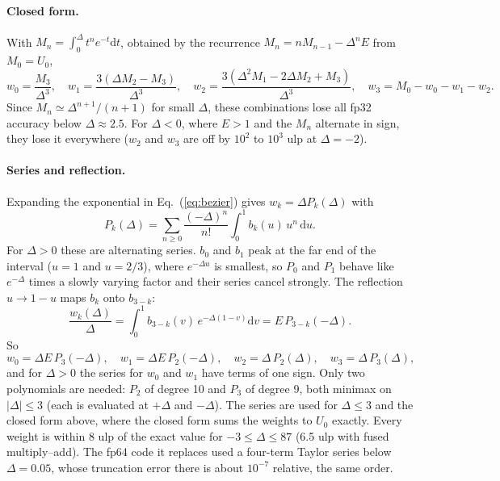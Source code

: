 \documentclass[paper=a4, fontsize=11pt]{scrartcl}
\numberwithin{equation}{section}
\numberwithin{table}{section}
\begin{document}
\paragraph{Closed form.}
With $M_n=\int_0^\Delta t^n e^{-t}\mathrm{d}t$, obtained by the recurrence
$M_n = nM_{n-1}-\Delta^nE$ from $M_0=U_0$,
\begin{equation}
  w_0 = \frac{M_3}{\Delta^3},\quad
  w_1 = \frac{3(\Delta M_2-M_3)}{\Delta^3},\quad
  w_2 = \frac{3(\Delta^2M_1-2\Delta M_2+M_3)}{\Delta^3},\quad
  w_3 = M_0-w_0-w_1-w_2 .
\end{equation}
Since $M_n\simeq\Delta^{n+1}/(n+1)$ for small $\Delta$, these combinations lose
all fp32 accuracy below $\Delta\approx2.5$. For $\Delta<0$, where $E>1$ and the
$M_n$ alternate in sign, they lose it everywhere ($w_2$ and $w_3$ are off by
$10^2$ to $10^3$ ulp at $\Delta=-2$).

\paragraph{Series and reflection.}
Expanding the exponential in Eq.~(\ref{eq:bezier}) gives $w_k=\Delta P_k(\Delta)$ with
\begin{equation}
  P_k(\Delta) = \sum_{n\ge0}\frac{(-\Delta)^n}{n!}\int_0^1 b_k(u)\,u^n\,\mathrm{d}u .
\end{equation}
For $\Delta>0$ these are alternating series. $b_0$ and $b_1$ peak at the far
end of the interval ($u=1$ and $u=2/3$), where $e^{-\Delta u}$ is smallest, so
$P_0$ and $P_1$ behave like $e^{-\Delta}$ times a slowly varying factor and their
series cancel strongly. The reflection $u\to1-u$ maps $b_k$ onto $b_{3-k}$:
\begin{equation}
  \frac{w_k(\Delta)}{\Delta} = \int_0^1 b_{3-k}(v)\,e^{-\Delta(1-v)}\mathrm{d}v
  = E\,P_{3-k}(-\Delta) .
\end{equation}
So
\begin{equation}
  w_0 = \Delta E\,P_3(-\Delta),\quad
  w_1 = \Delta E\,P_2(-\Delta),\quad
  w_2 = \Delta\,P_2(\Delta),\quad
  w_3 = \Delta\,P_3(\Delta),
\end{equation}
and for $\Delta>0$ the series for $w_0$ and $w_1$ have terms of one sign. Only
two polynomials are needed: $P_2$ of degree 10 and $P_3$ of degree 9, both
minimax on $|\Delta|\le3$ (each is evaluated at $+\Delta$ and $-\Delta$). The
series are used for $\Delta\le3$ and the closed form above, where the closed
form sums the weights to $U_0$ exactly. Every weight is within 8 ulp of the
exact value for $-3\le\Delta\le87$ (6.5 ulp with fused multiply--add). The fp64
code it replaces used a four-term Taylor series below $\Delta=0.05$, whose
truncation error there is about $10^{-7}$ relative, the same order.
\end{document}
